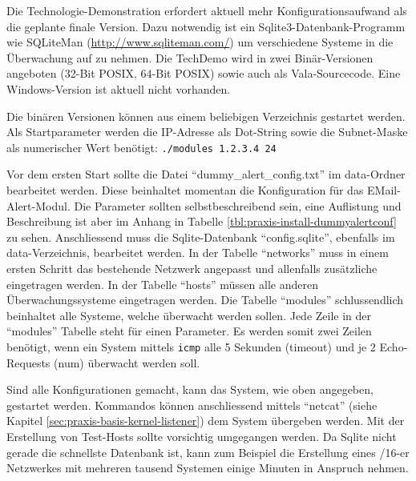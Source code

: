 Die Technologie-Demonstration erfordert aktuell mehr Konfigurationsaufwand als die geplante finale Version. Dazu notwendig ist ein Sqlite3-Datenbank-Programm wie SQLiteMan (\url{http://www.sqliteman.com/}) um verschiedene Systeme in die \"Uberwachung auf zu nehmen. Die TechDemo wird in zwei Bin\"ar-Versionen angeboten (32-Bit POSIX, 64-Bit POSIX) sowie auch als Vala-Sourcecode. Eine Windows-Version ist aktuell nicht vorhanden.

Die bin\"aren Versionen k\"onnen aus einem beliebigen Verzeichnis gestartet werden. Als Startparameter werden die IP-Adresse als Dot-String sowie die Subnet-Maske als numerischer Wert ben\"otigt: \texttt{./modules 1.2.3.4 24}

Vor dem ersten Start sollte die Datei "`dummy\_alert\_config.txt"' im data-Ordner bearbeitet werden. Diese beinhaltet momentan die Konfiguration f\"ur das EMail-Alert-Modul. Die Parameter sollten selbstbeschreibend sein, eine Auflistung und Beschreibung ist aber im Anhang in Tabelle \ref{tbl:praxis-install-dummyalertconf} zu sehen. Anschliessend muss die Sqlite-Datenbank "`config.sqlite"', ebenfalls im data-Verzeichnis, bearbeitet werden. In der Tabelle "`networks"' muss in einem ersten Schritt das bestehende Netzwerk angepasst und allenfalls zus\"atzliche eingetragen werden. In der Tabelle "`hosts"' m\"ussen alle anderen \"Uberwachungssysteme eingetragen werden. Die Tabelle "`modules"' schlussendlich beinhaltet alle Systeme, welche \"uberwacht werden sollen. Jede Zeile in der "`modules"' Tabelle steht f\"ur einen Parameter. Es werden somit zwei Zeilen ben\"otigt, wenn ein System mittels \texttt{icmp} alle 5 Sekunden (timeout) und je 2 Echo-Requests (num) \"uberwacht werden soll.

Sind alle Konfigurationen gemacht, kann das System, wie oben angegeben, gestartet werden. Kommandos k\"onnen anschliessend mittels "`netcat"' (siehe Kapitel \ref{sec:praxis-basis-kernel-listener}) dem System \"ubergeben werden. Mit der Erstellung von Test-Hosts sollte vorsichtig umgegangen werden. Da Sqlite nicht gerade die schnellste Datenbank ist, kann zum Beispiel die Erstellung eines /16-er Netzwerkes mit mehreren tausend Systemen einige Minuten in Anspruch nehmen.

